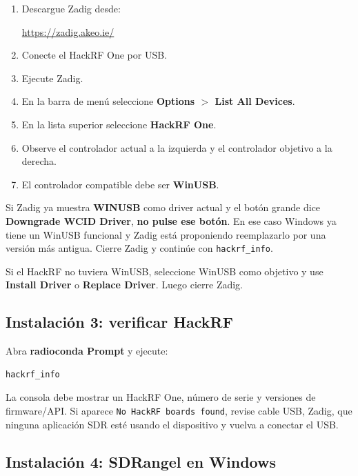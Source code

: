 \begin{enumerate}
    \item Descargue Zadig desde:
    \begin{center}
    \url{https://zadig.akeo.ie/}
    \end{center}
    \item Conecte el HackRF One por USB.
    \item Ejecute Zadig.
    \item En la barra de menú seleccione \textbf{Options $>$ List All Devices}.
    \item En la lista superior seleccione \textbf{HackRF One}.
    \item Observe el controlador actual a la izquierda y el controlador objetivo a la derecha.
    \item El controlador compatible debe ser \textbf{WinUSB}.
\end{enumerate}

\begin{alerta}
Si Zadig ya muestra \textbf{WINUSB} como driver actual y el botón grande dice \textbf{Downgrade WCID Driver}, \textbf{no pulse ese botón}. En ese caso Windows ya tiene un WinUSB funcional y Zadig está proponiendo reemplazarlo por una versión más antigua. Cierre Zadig y continúe con \texttt{hackrf\_info}.
\end{alerta}

Si el HackRF no tuviera WinUSB, seleccione WinUSB como objetivo y use \textbf{Install Driver} o \textbf{Replace Driver}. Luego cierre Zadig.

\subsection{Instalación 3: verificar HackRF}

Abra \textbf{radioconda Prompt} y ejecute:

\begin{lstlisting}
hackrf_info
\end{lstlisting}

\begin{esperado}
La consola debe mostrar un HackRF One, número de serie y versiones de firmware/API. Si aparece \texttt{No HackRF boards found}, revise cable USB, Zadig, que ninguna aplicación SDR esté usando el dispositivo y vuelva a conectar el USB.
\end{esperado}

\subsection{Instalación 4: SDRangel en Windows}

